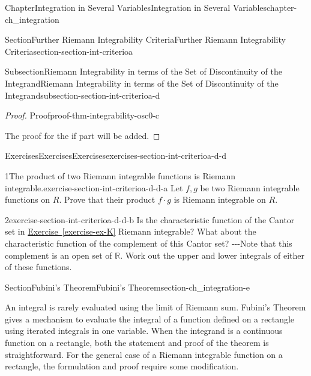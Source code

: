 \documentclass[oneside,10pt,]{book}
\newcommand{\xreffont}{\relax}
\numberwithin{equation}{section}
\newcommand{\bbR}{\mathbb{R}}
\begin{document}
\begin{chapterptx}{Chapter}{Integration in Several Variables}{}{Integration in Several Variables}{}{}{chapter-ch_integration}
\begin{sectionptx}{Section}{Further Riemann Integrability Criteria}{}{Further Riemann Integrability Criteria}{}{}{section-section-int-criterioa}
\begin{subsectionptx}{Subsection}{Riemann Integrability in terms of the Set of Discontinuity of the Integrand}{}{Riemann Integrability in terms of the Set of Discontinuity of the Integrand}{}{}{subsection-section-int-criterioa-d}
\begin{proof}{Proof}{}{proof-thm-integrability-osc0-c}
\par
The proof for the if part will be added.%
\end{proof}
%
%
\typeout{************************************************}
\typeout{************************************************}
%
\begin{exercises-subsubsection-numberless}{Exercises}{Exercises}{}{Exercises}{}{}{exercises-section-int-criterioa-d-d}
\begin{divisionexercise}{1}{The product of two Riemann integrable functions is Riemann integrable.}{}{exercise-section-int-criterioa-d-d-a}%
Let \(f, g\) be two Riemann integrable functions on \(R\). Prove that their product \(f\cdot g\) is Riemann integrable on \(R\).%
\end{divisionexercise}%
\begin{divisionexercise}{2}{}{}{exercise-section-int-criterioa-d-d-b}%
Is the characteristic function of the Cantor set in \hyperref[exercise-ex-K]{Exercise~{\xreffont\ref{exercise-ex-K}}} Riemann integrable? What about the characteristic function of the complement of this Cantor set? -{}-{}-Note that this complement is an open set of \(\bbR\). Work out the upper and lower integrals of either of these functions.%
\end{divisionexercise}%
\end{exercises-subsubsection-numberless}
\end{subsectionptx}
\end{sectionptx}
%
%
\typeout{************************************************}
\typeout{************************************************}
%
\begin{sectionptx}{Section}{Fubini's Theorem}{}{Fubini's Theorem}{}{}{section-ch_integration-e}
\begin{introduction}{}%
An integral is rarely evaluated using the limit of Riemann sum. Fubini's Theorem gives a mechanism to evaluate the integral of a function defined on a rectangle using iterated integrals in one variable. When the integrand is a continuous function on a rectangle, both the statement and proof of the theorem is straightforward. For the general case of a Riemann integrable function on a rectangle, the formulation and proof require some modification.%
\end{introduction}%

\end{sectionptx}
\end{chapterptx}
\end{document}
